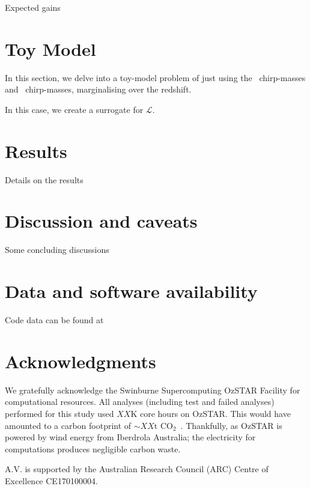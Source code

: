 \documentclass[twocolumn]{aastex631}
\begin{document}
Expected gains 




\section{Toy Model}

In this section, we delve into a toy-model problem of just using the \lvk\ chirp-masses and \compas\ chirp-masses, marginalising over the redshift. 

In this case, we create a surrogate for $\mathcal{L}$.





\section{Results}\label{sec:results}
Details on the results

\section{Discussion and caveats}\label{sec:conclusion}
Some concluding discussions

\section{Data and software availability}\label{sec:data}
Code data can be found at \projectGit






\section*{Acknowledgments}{


We gratefully acknowledge the Swinburne Supercomputing OzSTAR Facility for computational resources. All analyses (including test and failed analyses) performed for this study used $XX$K core hours on OzSTAR. This would have amounted to a carbon footprint of ${\sim XX{\text{t CO}_2}}$~\citep{greenhouse, energy_to_co2_converter}. Thankfully, as OzSTAR is powered by wind energy from Iberdrola Australia; the electricity for computations produces negligible carbon waste.


A.V. is supported by the Australian Research Council (ARC) Centre of Excellence CE170100004.

}

\vspace{5mm}
\end{document}
